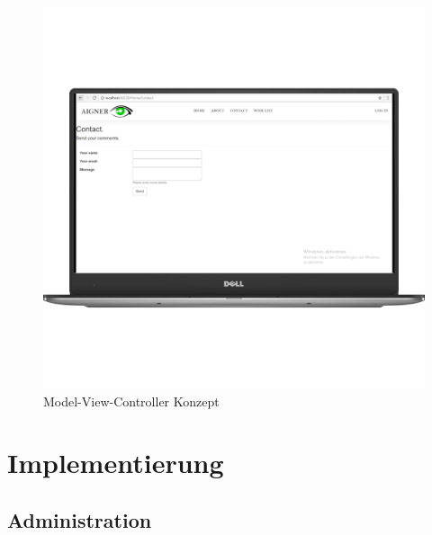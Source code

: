 \begin{figure}[H]
\begin{center}
	\includegraphics[scale=.2]{images/Contact.png}
\end{center}
	\caption{Model-View-Controller Konzept}
	\label{fig:sample}
\end{figure}



\chapter{Implementierung}\label{cha:theoretical-background}
\section{Administration}
